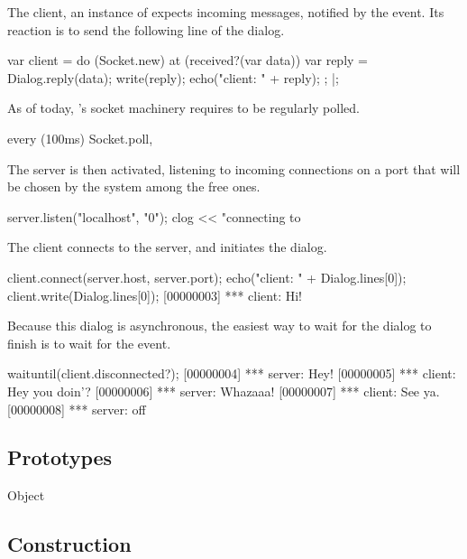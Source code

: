 The client, an instance of  expects incoming messages,
notified by the  event.  Its reaction is to send the
following line of the dialog.

\begin{urbiscript}
var client =
  do (Socket.new)
  {
    at (received?(var data))
    {
      var reply = Dialog.reply(data);
      write(reply);
      echo("client: " + reply);
    };
  }|;
\end{urbiscript}

As of today, \us's socket machinery requires to be regularly polled.

\begin{urbiscript}
every (100ms)
  Socket.poll,
\end{urbiscript}

The server is then activated, listening to incoming connections on a port
that will be chosen by the system among the free ones.

\begin{urbiscript}
server.listen("localhost", "0");
clog << "connecting to %
\end{urbiscript}

The client connects to the server, and initiates the dialog.

\begin{urbiscript}
client.connect(server.host, server.port);
echo("client: " + Dialog.lines[0]);
client.write(Dialog.lines[0]);
[00000003] *** client: Hi!
\end{urbiscript}

Because this dialog is asynchronous, the easiest way to wait for the dialog
to finish is to wait for the  event.

\begin{urbiscript}
waituntil(client.disconnected?);
[00000004] *** server: Hey!
[00000005] *** client: Hey you doin'?
[00000006] *** server: Whazaaa!
[00000007] *** client: See ya.
[00000008] *** server: off
\end{urbiscript}

\subsection{Prototypes}
\begin{refObjects}
\item[Object]
\end{refObjects}

\subsection{Construction}


